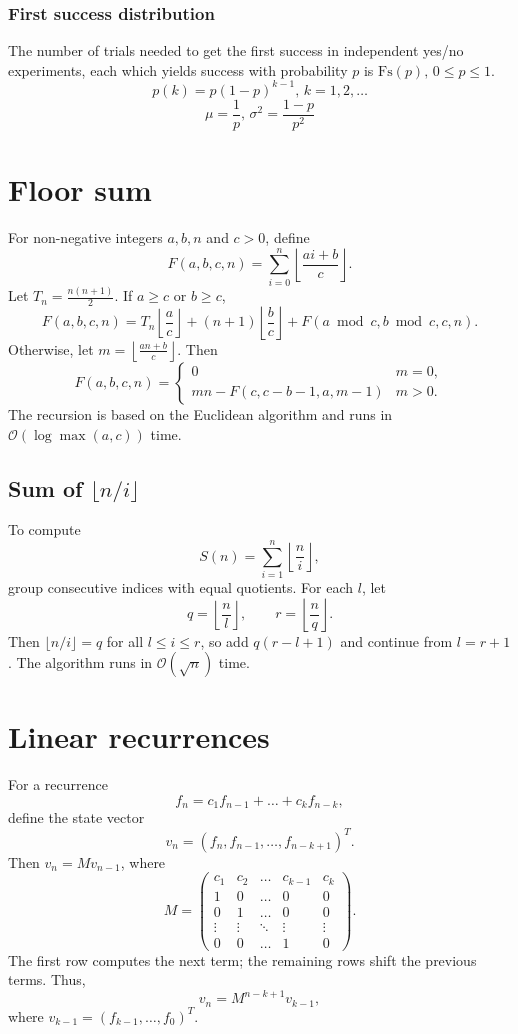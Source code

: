 \subsubsection{First success distribution}
The number of trials needed to get the first success in independent yes/no experiments, each which yields success with probability $p$ is $\textrm{Fs}(p),\,0\leq p\leq1$.
\[p(k)=p(1-p)^{k-1},\,k=1,2,\dots\]
\[\mu = \frac1p,\,\sigma^2=\frac{1-p}{p^2}\]

\section{Floor sum}
For non-negative integers $a,b,n$ and $c>0$, define
\[F(a,b,c,n)=\sum_{i=0}^{n}\left\lfloor\frac{ai+b}{c}\right\rfloor.\]
Let $T_n=\frac{n(n+1)}{2}$. If $a\ge c$ or $b\ge c$,
\[F(a,b,c,n)=T_n\left\lfloor\frac ac\right\rfloor
+(n+1)\left\lfloor\frac bc\right\rfloor
+F(a\bmod c,b\bmod c,c,n).\]
Otherwise, let $m=\left\lfloor\frac{an+b}{c}\right\rfloor$. Then
\[F(a,b,c,n)=
\begin{cases}
0 & m=0,\\
mn-F(c,c-b-1,a,m-1) & m>0.
\end{cases}\]
The recursion is based on the Euclidean algorithm and runs in
$\mathcal{O}(\log\max(a,c))$ time.

\subsection{Sum of $\lfloor n/i \rfloor$}
To compute
\[S(n)=\sum_{i=1}^{n}\left\lfloor\frac{n}{i}\right\rfloor,\]
group consecutive indices with equal quotients. For each $l$, let
\[q=\left\lfloor\frac{n}{l}\right\rfloor,\qquad
r=\left\lfloor\frac{n}{q}\right\rfloor.\]
Then $\lfloor n/i\rfloor=q$ for all $l\le i\le r$, so add
$q(r-l+1)$ and continue from $l=r+1$.
The algorithm runs in $\mathcal{O}(\sqrt n)$ time.

\section{Linear recurrences}

For a recurrence
\[f_n=c_1f_{n-1}+\dots+c_kf_{n-k},\]
define the state vector
\[v_n=(f_n,f_{n-1},\dots,f_{n-k+1})^T.\]
Then $v_n=Mv_{n-1}$, where
\[
M=\begin{pmatrix}
c_1&c_2&\dots&c_{k-1}&c_k\\
1&0&\dots&0&0\\
0&1&\dots&0&0\\
\vdots&\vdots&\ddots&\vdots&\vdots\\
0&0&\dots&1&0
\end{pmatrix}.
\]
The first row computes the next term; the remaining rows
shift the previous terms. Thus,
\[v_n=M^{n-k+1}v_{k-1},\]
where $v_{k-1}=(f_{k-1},\dots,f_0)^T$.